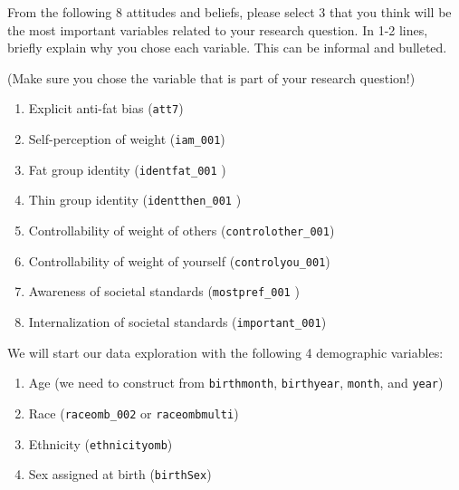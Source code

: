 \documentclass[
  letterpaper,
  DIV=11,
  numbers=noendperiod]{scrartcl}
\providecommand{\tightlist}{%
  \setlength{\itemsep}{0pt}\setlength{\parskip}{0pt}}\usepackage{longtable,booktabs,array}
\begin{document}
\begin{tcolorbox}[enhanced jigsaw, colframe=quarto-callout-important-color-frame, arc=.35mm, colbacktitle=quarto-callout-important-color!10!white, bottomrule=.15mm, left=2mm, breakable, opacitybacktitle=0.6, rightrule=.15mm, opacityback=0, bottomtitle=1mm, coltitle=black, leftrule=.75mm, toptitle=1mm, titlerule=0mm, title=\textcolor{quarto-callout-important-color}{\faExclamation}\hspace{0.5em}{Task}, toprule=.15mm, colback=white]

From the following 8 attitudes and beliefs, please select 3 that you
think will be the most important variables related to your research
question. In 1-2 lines, briefly explain why you chose each variable.
This can be informal and bulleted.

\end{tcolorbox}

(Make sure you chose the variable that is part of your research
question!)

\begin{enumerate}
\def\labelenumi{\arabic{enumi}.}
\tightlist
\item
  Explicit anti-fat bias (\texttt{att7})
\item
  Self-perception of weight (\texttt{iam\_001})
\item
  Fat group identity (\texttt{identfat\_001} )
\item
  Thin group identity (\texttt{identthen\_001} )
\item
  Controllability of weight of others (\texttt{controlother\_001})
\item
  Controllability of weight of yourself (\texttt{controlyou\_001})
\item
  Awareness of societal standards (\texttt{mostpref\_001} )
\item
  Internalization of societal standards (\texttt{important\_001})
\end{enumerate}

We will start our data exploration with the following 4 demographic
variables:

\begin{enumerate}
\def\labelenumi{\arabic{enumi}.}
\tightlist
\item
  Age (we need to construct from \texttt{birthmonth},
  \texttt{birthyear}, \texttt{month}, and \texttt{year})
\item
  Race (\texttt{raceomb\_002} or \texttt{raceombmulti})
\item
  Ethnicity (\texttt{ethnicityomb})
\item
  Sex assigned at birth (\texttt{birthSex})
\end{enumerate}
\end{document}
